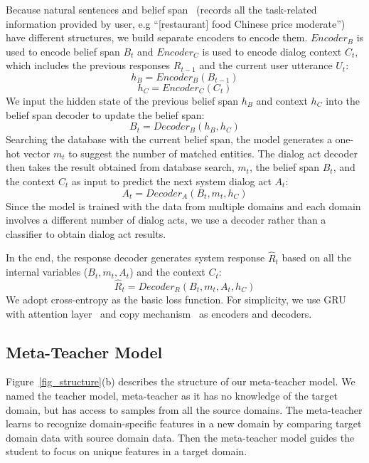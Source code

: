 \documentclass[letterpaper]{article} %
\begin{document}
Because natural sentences and belief span~\citep{lei2018sequicity} (records all the task-related information provided by user, e.g ``[restaurant] food Chinese price moderate'') have different structures, we build  separate encoders to encode them. $Encoder_B$ is used to encode belief span $B_t$ and $Encoder_C$ is used to encode dialog context $C_t$, which includes the previous responses $R_{t-1}$ and  the current user utterance $U_t$:
            $$h_B=Encoder_B(B_{t-1})$$
            $$h_C=Encoder_C(C_t)$$
We input the hidden state of the previous belief span $h_B$ and context $h_C$ into the belief span decoder to update the belief span:
            $${B}_t=Decoder_B(h_B,h_C)$$
Searching the database with the current belief span, the model generates a one-hot vector $m_t$ to suggest the number of matched entities.
%
The dialog act decoder then takes the result obtained from database search, $m_t$, the belief span $B_t$, and the context $C_t$ as input to predict the next system dialog act $A_t$:
            $${A}_t=Decoder_A(B_t,m_t,h_C)$$
Since the model is trained with the data from multiple domains and each domain involves a different number of dialog acts, we use a decoder rather than a classifier to obtain dialog act results.

In the end, the response decoder generates system response $\hat{R}_t$ based on all the internal variables ($B_t,m_t,A_t$) and the context $C_t$:
            $$\hat{R}_t=Decoder_R(B_t,m_t,A_t,h_C)$$
We adopt cross-entropy as the basic loss function.
For simplicity, we use GRU~\citep{cho2014learning} with attention layer~\citep{bahdanau2014neural} and copy mechanism~\citep{Gu2016IncorporatingCM} as encoders and decoders.





\subsection*{Meta-Teacher Model}
Figure~\ref{fig_structure}(b) describes the structure of our meta-teacher model. We named the teacher model, meta-teacher as it has no knowledge of the target domain, but has access to samples from all the source domains.
The meta-teacher learns to recognize domain-specific features in a new domain by comparing target domain data with source domain data. Then the meta-teacher model guides the student to focus on unique features in a target domain.
\end{document}
